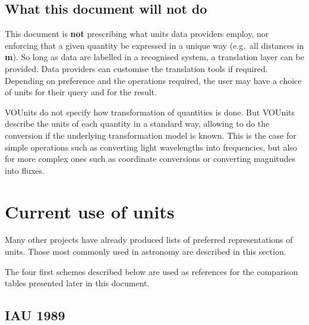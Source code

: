 \documentclass[12pt,notitlepage,onecolumn]{ivoa}
\def\eg{e.g.~}
\newcommand{\unit}[1]{\textbf{\textsf{\color{orange}#1}}}
\newcommand{\violet}{\textcolor[rgb]{0.50,0.00,0.50}}
\begin{document}
\subsection {What this document will not do}
\label{sec:outofscope}

This document is \textbf{not} prescribing what units data providers
employ, nor enforcing that a given quantity be expressed in a
unique way (\eg all distances in \unit{m}).  So long as data are labelled 
in a recognised system, a
translation layer can be provided. Data providers can customise the
translation tools if required. Depending on preference and the
operations required, the user may have a choice of units for their
query and for the result.

VOUnits do not specify how transformation of quantities is done. But VOUnits describe the
units of each quantity in a standard way, allowing to do the conversion if the underlying transformation 
model is known. This is the case for simple operations such as converting light wavelengths into
frequencies, but also for more complex ones such as coordinate conversions or converting
magnitudes into fluxes.


\section{Current use of units}
\label{sec:current}

Many other projects have already produced lists of preferred
representations of units. Those most commonly used in
astronomy are described in this section. 

The four first schemes described below are used as references for the
comparison tables presented later in this document.

\subsection{IAU 1989\label{sec:IAU}}
\end{document}
